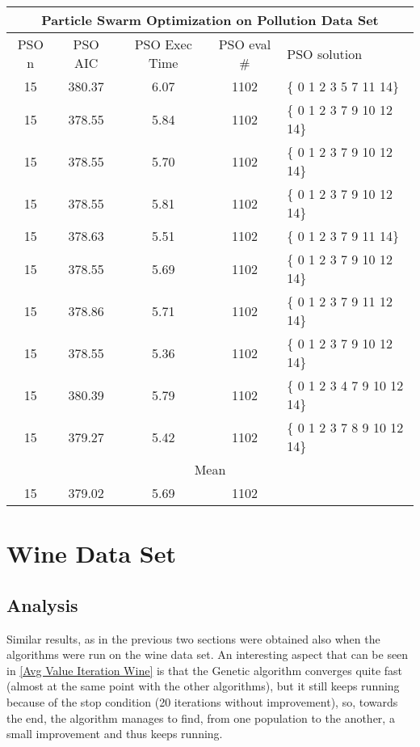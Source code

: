 \begin{tabular}{|c|c|c|c|l|}
	\hline
	\multicolumn{5}{|c|}{Particle Swarm Optimization on Pollution Data Set}                         \\ \hline
	PSO n & PSO AIC     & PSO Exec Time & PSO eval \# & PSO solution                \\ \hline
	15    & 380.37 & 6.07              & 1102                   & \{ 0 1 2 3 5 7 11 14\}      \\ \hline
	15    & 378.55 & 5.84              & 1102                   & \{ 0 1 2 3 7 9 10 12 14\}   \\ \hline
	15    & 378.55 & 5.70              & 1102                   & \{ 0 1 2 3 7 9 10 12 14\}   \\ \hline
	15    & 378.55 & 5.81              & 1102                   & \{ 0 1 2 3 7 9 10 12 14\}   \\ \hline
	15    & 378.63 & 5.51              & 1102                   & \{ 0 1 2 3 7 9 11 14\}      \\ \hline
	15    & 378.55 & 5.69              & 1102                   & \{ 0 1 2 3 7 9 10 12 14\}   \\ \hline
	15    & 378.86 & 5.71              & 1102                   & \{ 0 1 2 3 7 9 11 12 14\}   \\ \hline
	15    & 378.55 & 5.36               & 1102                   & \{ 0 1 2 3 7 9 10 12 14\}   \\ \hline
	15    & 380.39 & 5.79              & 1102                   & \{ 0 1 2 3 4 7 9 10 12 14\} \\ \hline
	15    & 379.27  & 5.42              & 1102                   & \{ 0 1 2 3 7 8 9 10 12 14\} \\ \hline
	\multicolumn{5}{|c|}{Mean}                                                                      \\ \hline
	15    & 379.02& 5.69             & 1102                   &                             \\ \hline
\end{tabular}

\section{Wine Data Set}
\subsection{Analysis}
Similar results, as in the previous two sections were obtained also when the algorithms were run on the wine data set. An interesting aspect that can be seen in \ref{Avg Value Iteration Wine} is that the Genetic algorithm  converges quite fast (almost at the same point with the other algorithms), but it still keeps running because of the stop condition (20 iterations without improvement), so, towards the end, the algorithm manages to find, from one population to the another, a small improvement and thus keeps running.

